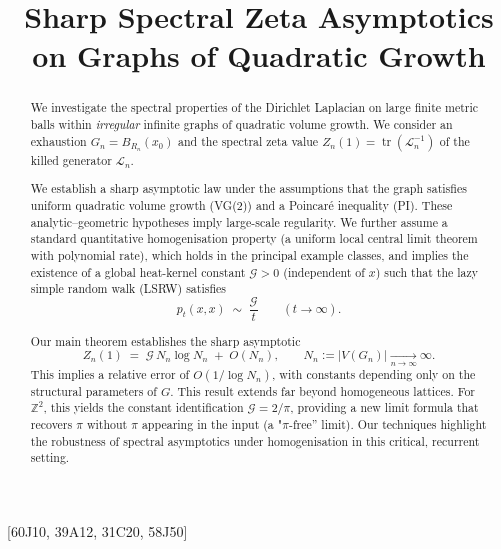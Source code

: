 \documentclass{article}
\numberwithin{equation}{section}
\theoremstyle{definition}
\theoremstyle{remark}
\newcommand{\cG}{\mathcal{G}}
\DeclareMathOperator{\tr}{tr}
\newcommand{\LL}{\mathcal{L}}
\begin{document}
\title{Sharp Spectral Zeta Asymptotics on Graphs of Quadratic Growth}



[60J10, 39A12, 31C20, 58J50]

\begin{abstract}
We investigate the spectral properties of the Dirichlet Laplacian on large finite metric balls within \emph{irregular} infinite graphs of quadratic volume growth.
We consider an exhaustion $G_n=B_{R_n}(x_0)$ and the spectral zeta value
$Z_n(1)=\tr(\LL_n^{-1})$ of the killed generator $\LL_n$.

We establish a sharp asymptotic law under the assumptions that the graph satisfies uniform quadratic volume growth (VG(2)) and a Poincaré inequality (PI). These analytic–geometric hypotheses imply large-scale regularity. We further assume a standard quantitative homogenisation property (a uniform local central limit theorem with polynomial rate), which holds in the principal example classes, and implies the existence of a global heat-kernel constant $\cG>0$ (independent of $x$) such that the lazy simple random walk (LSRW) satisfies
\[
  p_t(x,x)\;\sim\;\frac{\cG}{t}\qquad(t\to\infty).
\]

Our main theorem establishes the sharp asymptotic
\[
  Z_n(1)\;=\;\cG\,N_n\log N_n\;+\; O(N_n),\qquad N_n:=|V(G_n)|\xrightarrow[n\to\infty]{}\infty.
\]
This implies a relative error of $O(1/\log N_n)$, with constants depending only on the structural parameters of $G$.
This result extends far beyond homogeneous lattices.
For $\mathbb Z^2$, this yields the constant identification $\cG = 2/\pi$, providing a new limit formula that recovers $\pi$ without $\pi$ appearing in the input (a "$\pi$-free'' limit).
Our techniques highlight the robustness of spectral asymptotics under homogenisation in this critical, recurrent setting.
\end{abstract}

\maketitle
\end{document}
